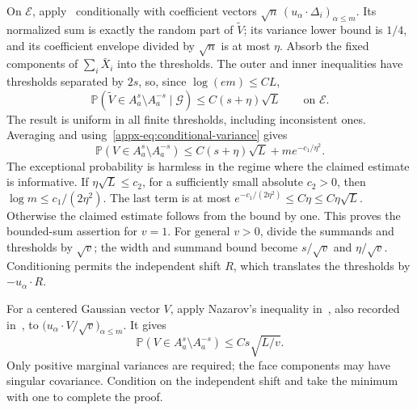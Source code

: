\documentclass[11pt,letterpaper]{article}
\theoremstyle{remark}
\newcommand{\Pp}{\mathbb P}
\begin{document}
On \(\mathcal E\), apply~\cite[Lemma~J.4]{CCKK2022} conditionally
with coefficient vectors
\(\sqrt n\,(u_\alpha\cdot\Delta_i)_{\alpha\le m}\).
Its normalized sum is exactly the random part of \(\widetilde V\);
its variance lower bound is \(1/4\), and its coefficient envelope
divided by \(\sqrt n\) is at most \(\eta\). Absorb the fixed
components of \(\sum_i\bar X_i\) into the thresholds. The outer and inner inequalities have thresholds
separated by \(2s\), so, since \(\log(em)\le CL\),
\[
 \Pp(\widetilde V\in A_a^s\setminus A_a^{-s}\mid\mathcal G)
 \le C(s+\eta)\sqrt L\qquad\text{on }\mathcal E.
\]
The result is uniform in all finite thresholds, including inconsistent
ones. Averaging and using~\eqref{appx-eq:conditional-variance} gives
\begin{equation}
 \Pp(V\in A_a^s\setminus A_a^{-s})
 \le C(s+\eta)\sqrt L+m e^{-c_1/\eta^2}.
 \label{appx-eq:concentration-pairs}
\end{equation}
The exceptional probability is harmless in the regime where the
claimed estimate is informative. If \(\eta\sqrt L\le c_2\),
for a sufficiently small absolute
\(c_2>0\), then \(\log m\le c_1/(2\eta^2)\). The last term is
at most \(e^{-c_1/(2\eta^2)}\le C\eta\le C\eta\sqrt L\).
Otherwise the claimed estimate follows from the bound by one.
This proves the bounded-sum assertion for \(v=1\).
For general \(v>0\), divide the summands and thresholds by
\(\sqrt v\); the width and summand bound become \(s/\sqrt v\)
and \(\eta/\sqrt v\). Conditioning permits the independent shift
\(R\), which translates the thresholds by \(-u_\alpha\cdot R\).

For a centered Gaussian vector \(V\), apply Nazarov's inequality
in~\cite[Lemma~A.1]{CCK2017}, also recorded
in~\cite[Lemma~J.3]{CCKK2022}, to
\(\bigl(u_\alpha\cdot V/\sqrt v\bigr)_{\alpha\le m}\). It gives
\[
 \Pp(V\in A_a^s\setminus A_a^{-s})\le Cs\sqrt{L/v}.
\]
Only positive marginal variances are required; the face components
may have singular covariance. Condition on the independent shift
and take the minimum with one to complete the proof.

\end{document}
